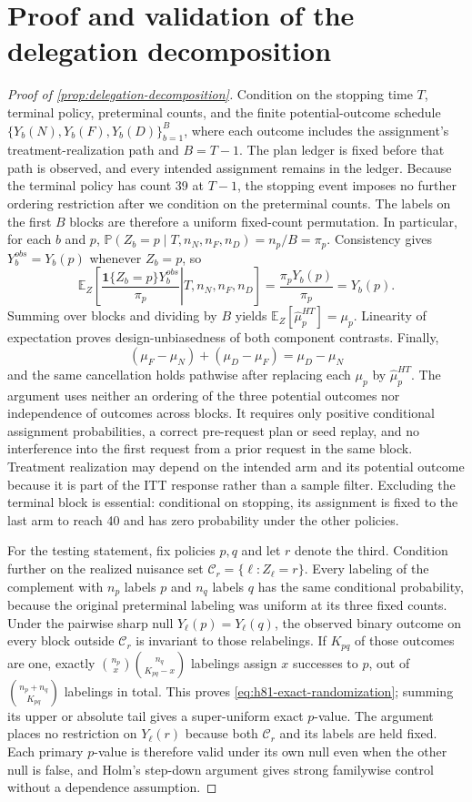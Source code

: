 \documentclass[11pt]{article}
\newcommand{\E}{\mathbb{E}}
\newcommand{\Prb}{\mathbb{P}}
\newcommand{\1}{\mathbf{1}}
\begin{document}
\section{Proof and validation of the delegation decomposition}
\label{app:h81-proof}

\begin{proof}[Proof of \cref{prop:delegation-decomposition}]
Condition on the stopping time $T$, terminal policy, preterminal counts, and the
finite potential-outcome schedule
$\{Y_b(N),Y_b(F),Y_b(D)\}_{b=1}^{B}$, where each outcome includes the
assignment's treatment-realization path and $B=T-1$.  The plan ledger is fixed
before that path is observed, and every intended assignment remains in the
ledger.  Because the terminal
policy has count 39 at $T-1$, the stopping event imposes no further ordering
restriction after we condition on the preterminal counts.  The labels on the
first $B$ blocks are therefore a uniform fixed-count permutation.  In
particular, for each $b$ and $p$,
$\Prb(Z_b=p\mid T,n_N,n_F,n_D)=n_p/B=\pi_p$.  Consistency gives
$Y_b^{obs}=Y_b(p)$ whenever $Z_b=p$, so
\[
 \E_Z\!\left[
   \left.\frac{\1\{Z_b=p\}Y_b^{obs}}{\pi_p}
   \right|T,n_N,n_F,n_D
 \right]
 =\frac{\pi_pY_b(p)}{\pi_p}=Y_b(p).
\]
Summing over blocks and dividing by $B$ yields
$\E_Z[\widehat\mu^{HT}_p]=\mu_p$.  Linearity of expectation proves
design-unbiasedness of both component contrasts.  Finally,
\[
 (\mu_F-\mu_N)+(\mu_D-\mu_F)=\mu_D-\mu_N
\]
and the same cancellation holds pathwise after replacing each $\mu_p$ by
$\widehat\mu^{HT}_p$.  The argument uses neither an ordering of the three
potential outcomes nor independence of outcomes across blocks.  It requires only
positive conditional assignment probabilities, a correct pre-request plan or
seed replay, and no interference into the first request from a prior request in
the same block.  Treatment realization may depend on the intended arm and its
potential outcome because it is part of the ITT response rather than a sample
filter.
Excluding the terminal block is essential: conditional on stopping, its
assignment is fixed to the last arm to reach 40 and has zero probability under
the other policies.

For the testing statement, fix policies $p,q$ and let $r$ denote the third.
Condition further on the realized nuisance set
$\mathcal C_r=\{\ell:Z_\ell=r\}$.  Every labeling of the complement with
$n_p$ labels $p$ and $n_q$ labels $q$ has the same conditional probability,
because the original preterminal labeling was uniform at its three fixed counts.
Under the pairwise sharp null $Y_\ell(p)=Y_\ell(q)$, the observed binary outcome
on every block outside $\mathcal C_r$ is invariant to those relabelings.  If
$K_{pq}$ of those outcomes are one, exactly
$\binom{n_p}{x}\binom{n_q}{K_{pq}-x}$ labelings assign $x$ successes to $p$,
out of $\binom{n_p+n_q}{K_{pq}}$ labelings in total.  This proves
\cref{eq:h81-exact-randomization}; summing its upper or absolute tail gives a
super-uniform exact $p$-value.  The argument places no restriction on
$Y_\ell(r)$ because both $\mathcal C_r$ and its labels are held fixed.  Each
primary $p$-value is therefore valid under its own null even when the other null
is false, and Holm's step-down argument gives strong familywise control without
a dependence assumption.


\end{proof}
\end{document}
